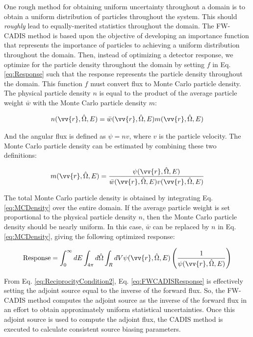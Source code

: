 \documentclass[10pt]{article}
\begin{document}
\begin{flushleft}
One rough method for obtaining uniform uncertainty throughout a domain is to obtain a uniform distribution of particles throughout the system. This should \textit{roughly} lead to equally-merited statistics throughout the domain. The FW-CADIS method is based upon the objective of developing an importance function that represents the importance of particles to achieving a uniform distribution throughout the domain. Then, instead of optimizing a detector response, we optimize for the particle density throughout the domain by setting \(f\) in Eq. \eqref{eq:Response} such that the response represents the particle density throughout the domain. This function \(f\) must convert flux to Monte Carlo particle density. The physical particle density \(n\) is equal to the product of the average particle weight \(\bar{w}\) with the Monte Carlo particle density \(m\):

\begin{equation}
n(\vv{r},\hat{\Omega},E)=\bar{w}(\vv{r},\hat{\Omega},E)m(\vv{r},\hat{\Omega},E)
\end{equation}

And the angular flux is defined as \(\psi=nv\), where \(v\) is the particle velocity. The Monte Carlo particle density can be estimated by combining these two definitions:

\begin{equation}
\label{eq:MCDensity}
m(\vv{r},\hat{\Omega},E)=\frac{\psi(\vv{r},\hat{\Omega},E)}{\bar{w}(\vv{r},\hat{\Omega},E)v(\vv{r},\hat{\Omega},E)}
\end{equation}

The total Monte Carlo particle density is obtained by integrating Eq. \eqref{eq:MCDensity} over the entire domain. If the average particle weight is set proportional to the physical particle density \(n\), then the Monte Carlo particle density should be nearly uniform. In this case, \(\bar{w}\) can be replaced by \(n\) in Eq. \eqref{eq:MCDensity}, giving the following optimized response:

\begin{equation}
\label{eq:FWCADISResponse}
\textrm{Response}=\int_0^\infty dE\int_{4\pi}d\hat{\Omega}\int_RdV\psi(\vv{r},\hat{\Omega},E)\left(\frac{1}{\psi(\vv{r},\hat{\Omega},E)}\right)
\end{equation}

From Eq. \eqref{eq:ReciprocityCondition2}, Eq. \eqref{eq:FWCADISResponse} is effectively setting the adjoint source equal to the inverse of the forward flux. So, the FW-CADIS method computes the adjoint source as the inverse of the forward flux in an effort to obtain approximately uniform statistical uncertainties. Once this adjoint source is used to compute the adjoint flux, the CADIS method is executed to calculate consistent source biasing parameters.


\end{flushleft}
\end{document}
